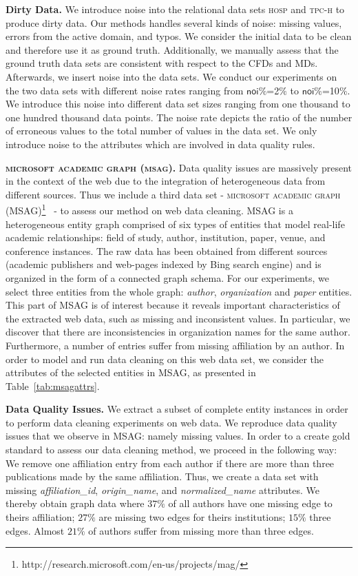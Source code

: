 \textbf{Dirty Data.} We introduce noise into the relational data sets \textsc{hosp} and \textsc{tpc-h} to produce dirty data. Our methods handles several kinds of noise: missing values, errors from the active domain, and typos. We consider the initial data to be clean and therefore use it as ground truth. Additionally, we manually assess that the ground truth data sets are consistent with respect to the CFDs and MDs. Afterwards, we insert noise into the data sets. We conduct our experiments on the two data sets with different noise rates ranging from $\mathsf{noi\%}$=2$\%$ to $\mathsf{noi\%}$=10$\%$. We introduce this noise into different data set sizes ranging from one thousand to one hundred thousand data points. The noise rate depicts the ratio of the number of erroneous values to the total number of values in the data set. We only introduce noise to the attributes which are involved in data quality rules.

\textbf{\textsc{microsoft academic graph (msag)}.} Data quality issues are massively present in the context of the web due to the integration of heterogeneous data from different sources. Thus we include a third data set - \textsc{microsoft academic graph (MSAG)}\footnote{http://research.microsoft.com/en-us/projects/mag/}~\cite{msag2015} - to assess our method on web data cleaning. MSAG is a heterogeneous entity graph comprised of six types of entities that model real-life academic relationships: field of study, author, institution, paper, venue, and conference instances. The raw data has been obtained from different sources (academic publishers and web-pages indexed by Bing search engine) and is organized in the form of a connected graph schema. For our experiments, we select three entities from the whole graph: \textit{author}, \textit{organization} and \textit{paper} entities. This part of \textsc{MSAG} is of interest because it reveals important characteristics of the extracted web data, such as missing and inconsistent values. In particular, we discover that there are inconsistencies in organization names for the same author. Furthermore, a number of entries suffer from missing affiliation by an author. In order to model and run data cleaning on this web data set, we consider the attributes of the selected entities in \textsc{MSAG}, as presented in Table~\ref{tab:msagattrs}. 

\textbf{Data Quality Issues.} We extract a subset of complete entity instances in order to perform data cleaning experiments on web data. We reproduce data quality issues that we observe in \textsc{MSAG}: namely missing values. In order to a create gold standard to assess our data cleaning method, we proceed in the following way: We remove one affiliation entry from each author if there are more than three publications made by the same affiliation. Thus, we create a data set with missing \textsl{affiliation\_id}, \textsl{origin\_name}, and \textsl{normalized\_name} attributes. We thereby obtain graph data where $37\%$ of all authors have one missing edge to theirs affiliation; $27\%$ are missing two edges for theirs institutions; $15\%$ three edges. Almost $21\%$ of authors suffer from missing more than three edges. 

